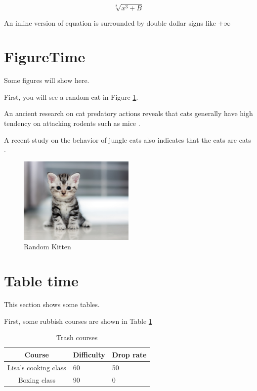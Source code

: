\documentclass{article}
\begin{document}
\begin{equation}
   \sqrt[8]{x^3 + B}
\end{equation}

An inline version of equation is surrounded by double dollar signs like $+\infty$



\section{FigureTime}

Some figures will show here.

First, you will see a random cat in Figure \ref{fig:randomKit}.

An ancient research on cat predatory actions reveals that cats generally have high tendency on attacking rodents such as mice \cite{reis1973predatory}.

A recent study on the behavior of jungle cats also indicates that the cats are cats \cite{MARINATH2019112651}.


\begin{figure}
    \centering
    \includegraphics[width=0.5\textwidth]{images/kittenrandom.jpg}
    \caption{Random Kitten}
    \label{fig:randomKit}
\end{figure}


\section{Table time}


This section shows some tables.

First, some rubbish courses are shown in Table \ref{table:trashCourses}

\begin{table}[ht]
\centering
\caption{Trash courses}
\label{table:trashCourses}
\begin{tabular}{|c|l|l|}
\hline
Course               & \multicolumn{1}{c|}{Difficulty} & \multicolumn{1}{c|}{Drop rate} \\ \hline
Lisa's cooking class & 60                              & 50                             \\ \hline
Boxing class         & 90                              & 0                              \\ \hline
\end{tabular}
\end{table}






\end{document}
